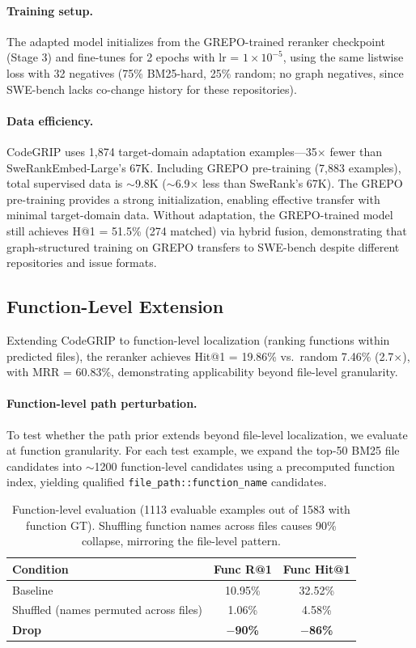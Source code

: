 \documentclass{article}
\begin{document}
\paragraph{Training setup.}
The adapted model initializes from the GREPO-trained reranker checkpoint (Stage 3) and fine-tunes for 2 epochs with lr = $1 \times 10^{-5}$, using the same listwise loss with 32 negatives (75\% BM25-hard, 25\% random; no graph negatives, since SWE-bench lacks co-change history for these repositories).

\paragraph{Data efficiency.}
CodeGRIP uses 1,874 target-domain adaptation examples---35$\times$ fewer than SweRankEmbed-Large's 67K.
Including GREPO pre-training (7,883 examples), total supervised data is $\sim$9.8K ($\sim$6.9$\times$ less than SweRank's 67K).
The GREPO pre-training provides a strong initialization, enabling effective transfer with minimal target-domain data.
Without adaptation, the GREPO-trained model still achieves H@1 = 51.5\% (274 matched) via hybrid fusion, demonstrating that graph-structured training on GREPO transfers to SWE-bench despite different repositories and issue formats.


\subsection{Function-Level Extension}
\label{app:function}
\label{sec:function_level}

Extending CodeGRIP to function-level localization (ranking functions within predicted files), the reranker achieves Hit@1 = 19.86\% vs.\ random 7.46\% (2.7$\times$), with MRR = 60.83\%, demonstrating applicability beyond file-level granularity.

\paragraph{Function-level path perturbation.}
To test whether the path prior extends beyond file-level localization, we evaluate at function granularity. For each test example, we expand the top-50 BM25 file candidates into $\sim$1200 function-level candidates using a precomputed function index, yielding qualified \texttt{file\_path::function\_name} candidates.

\begin{table}[h]
\centering
\caption{Function-level evaluation (1113 evaluable examples out of 1583 with function GT). Shuffling function names across files causes 90\% collapse, mirroring the file-level pattern.}
\label{tab:function_level}
\small
\begin{tabular}{lcc}
\toprule
\textbf{Condition} & \textbf{Func R@1} & \textbf{Func Hit@1} \\
\midrule
Baseline & 10.95\% & 32.52\% \\
Shuffled (names permuted across files) & 1.06\% & 4.58\% \\
\midrule
\textbf{Drop} & \textbf{$-$90\%} & \textbf{$-$86\%} \\
\bottomrule
\end{tabular}
\end{table}
\end{document}
